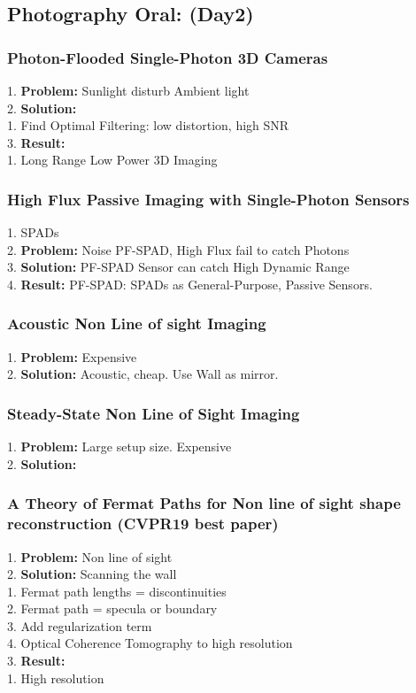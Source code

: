 \subsection{Photography Oral: (Day2)}
\subsubsection{Photon-Flooded Single-Photon 3D Cameras}
    1. {\bf Problem:} Sunlight disturb Ambient light \\
    2. {\bf Solution:}  \\
        1. Find Optimal Filtering: low distortion, high SNR \\
    3. {\bf Result:} \\
        1. Long Range Low Power 3D Imaging \\
\subsubsection{High Flux Passive Imaging with Single-Photon Sensors}
    1. SPADs \\
    2. {\bf Problem:} Noise PF-SPAD, High Flux fail to catch Photons \\
    3. {\bf Solution:} PF-SPAD Sensor can catch High Dynamic Range \\
    4. {\bf Result:} PF-SPAD: SPADs as General-Purpose, Passive Sensors. \\
\subsubsection{Acoustic Non Line of sight Imaging}
    1. {\bf Problem:} Expensive \\
    2. {\bf Solution:} Acoustic, cheap. Use Wall as mirror. \\
\subsubsection{Steady-State Non Line of Sight Imaging}
    1. {\bf Problem:} Large setup size. Expensive \\
    2. {\bf Solution:} \\
\subsubsection{A Theory of Fermat Paths for Non line of sight shape reconstruction (CVPR19 best paper)}
    1. {\bf Problem:} Non line of sight \\
    2. {\bf Solution:} Scanning the wall \\
        1. Fermat path lengths = discontinuities \\
        2. Fermat path = specula or boundary \\
        3. Add regularization term \\
        4. Optical Coherence Tomography to high resolution \\
    3. {\bf Result:}  \\
        1. High resolution \\

